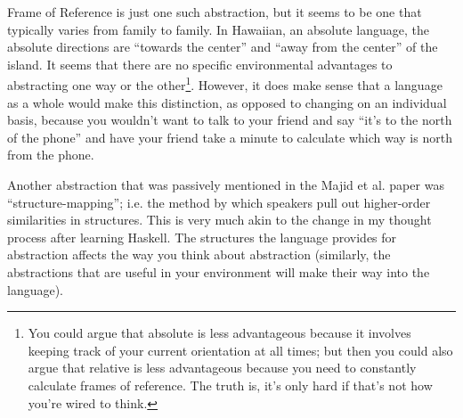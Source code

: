 \documentclass[12pt]{article}
\begin{document}
Frame of Reference is just one such abstraction, but it seems to be one
that typically varies from family to family.  In Hawaiian, an absolute
language, the absolute directions are ``towards the center'' and ``away
from the center'' of the island.  It seems that there are no specific
environmental advantages to abstracting one way or the
other\footnote{You could argue that absolute is less advantageous
because it involves keeping track of your current orientation at all
times; but then you could also argue that relative is less advantageous
because you need to constantly calculate frames of reference.  The truth
is, it's only hard if that's not how you're wired to think.}.  However,
it does make sense that a language as a whole would make this
distinction, as opposed to changing on an individual basis, because you
wouldn't want to talk to your friend and say ``it's to the north of the
phone'' and have your friend take a minute to calculate which way is
north from the phone.

Another abstraction that was passively mentioned in the Majid et al.
paper was ``structure-mapping''; i.e. the method by which speakers pull
out higher-order similarities in structures.  This is very much akin to
the change in my thought process after learning Haskell.  The structures
the language provides for abstraction affects the way you think about
abstraction (similarly, the abstractions that are useful in your
environment will make their way into the language).
\end{document}
